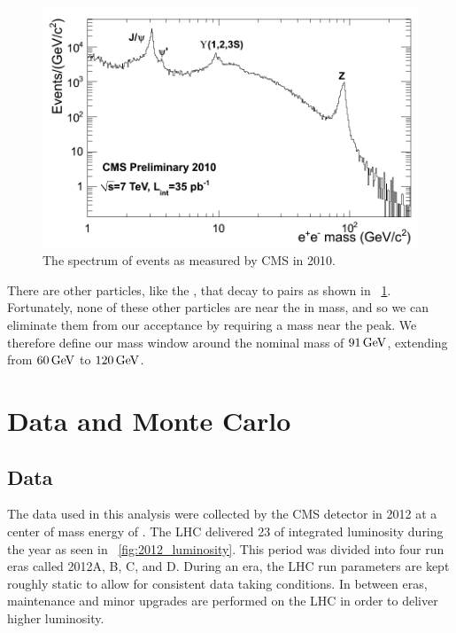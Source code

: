 \begin{figure}[tb]
    \centering
    \includegraphics[width=\textwidth]{figures/dielectron_mass_7tev.png}
    \caption{The spectrum of \ee events as measured by CMS in 2010.}
    \label{fig:ee_spectrum}
\end{figure}

There are other particles, like the \jpsi, that decay to \ee pairs as shown in
\FIG~\ref{fig:ee_spectrum}. Fortunately, none of these other particles are near
the \Z in mass, and so we can eliminate them from our acceptance by requiring a
mass near the \Z peak. We therefore define our mass window around the nominal
\Z mass of $91 \,\text{Ge\hspace{-.08em}V}$, extending from $60 \,\text{Ge\hspace{-.08em}V}$ to $120 \,\text{Ge\hspace{-.08em}V}$.

\section{Data and Monte Carlo}

\subsection{Data}

The data used in this analysis were collected by the CMS detector in 2012 at a
center of mass energy of \rootseight. The LHC delivered 23 \fbinv of integrated
luminosity during the year as seen in \FIG~\ref{fig:2012_luminosity}. This
period was divided into four run eras called 2012A, B, C, and D. During an era,
the LHC run parameters are kept roughly static to allow for consistent data
taking conditions. In between eras, maintenance and minor upgrades are
performed on the LHC in order to deliver higher luminosity.

